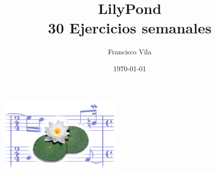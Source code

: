 \documentclass[a4paper,10pt,oneside,headinclude,titlepage]{article} %
\title{LilyPond\\30 Ejercicios semanales}
\author{Francisco Vila}
\date{\today}
\begin{document}
\nonfrenchspacing

\begin{titlepage} %
  \makeatletter
  \begin{center}
    \vfill
    \includegraphics[width=60mm]{lily-logo.png}\par
    \vfill
    \textbf{\huge\@title}\par
    {\@date}
    \vfill
    \textbf{\large\@author}
    \vfill
  \end{center}
  \makeatother
\end{titlepage}


\begin{singlespace} %
  \tableofcontents
\end{singlespace}
 
 
 
 
 
 
 
 
 
 
 
 
 
 
 
 
 
 
 
 
 
 
 
 
 
 
 
 
 
 
 
\end{document}
